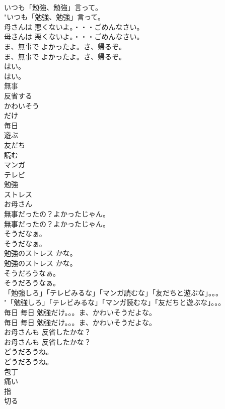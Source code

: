 \documentclass[8pt]{extreport}
\begin{document}
\begin{CJK}{UTF8}{min}
\\	いつも「勉強、勉強」言って。	
\\	"いつも「勉強、勉強」言って。 
\\	母さんは 悪くないよ。・・・ごめんなさい。	
\\	母さんは 悪くないよ。・・・ごめんなさい。 
\\	ま、無事で よかったよ。さ、帰るぞ。	
\\	ま、無事で よかったよ。さ、帰るぞ。 
\\	はい。	
\\	はい。 
\\	無事
\\	反省する
\\	かわいそう
\\	だけ
\\	毎日
\\	遊ぶ
\\	友だち
\\	読む
\\	マンガ
\\	テレビ
\\	勉強
\\	ストレス
\\	お母さん
\\	無事だったの？よかったじゃん。	
\\	無事だったの？よかったじゃん。 
\\	そうだなぁ。	
\\	そうだなぁ。 
\\	勉強のストレス かな。	
\\	勉強のストレス かな。 
\\	そうだろうなぁ。	
\\	そうだろうなぁ。 
\\	「勉強しろ」「テレビみるな」「マンガ読むな」「友だちと遊ぶな」。。。	
\\	"「勉強しろ」「テレビみるな」「マンガ読むな」「友だちと遊ぶな」。。。 
\\	毎日 毎日 勉強だけ。。。ま、かわいそうだよな。	
\\	毎日 毎日 勉強だけ。。。ま、かわいそうだよな。 
\\	お母さんも 反省したかな？	
\\	お母さんも 反省したかな？ 
\\	どうだろうね。	
\\	どうだろうね。 
\\	包丁
\\	痛い
\\	指
\\	切る

\end{CJK}
\end{document}
